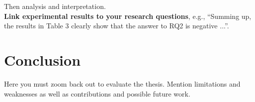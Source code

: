 \documentclass[a4paper,12pt]{Classes/RoboticsLaTeX}
\begin{document}
	\noindent Then analysis and interpretation.\\
	
	\textbf{Link experimental results to your research questions}, e.g., ``Summing up, the results in Table 3 clearly show that the answer to RQ2 is negative ...''.
	
	\chapter{Conclusion}
	\label{chap:conclusion}
	
	Here you must zoom back out to evaluate the thesis. Mention limitations and weaknesses as well as contributions and possible future work.
	
	 
	\renewcommand{\bibname}{References}           %
	
	
	
	
\end{document}
